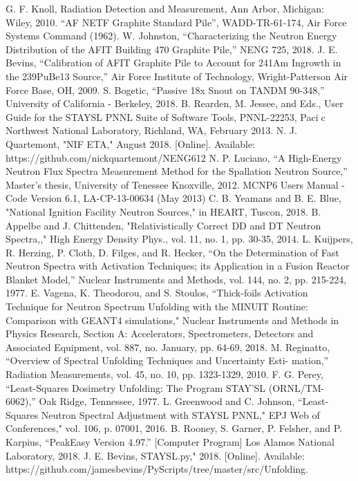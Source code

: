 \documentclass[journal]{IEEEtran}
\begin{document}
	\begin{thebibliography}{17}
		G. F. Knoll, Radiation Detection and Measurement, Ann Arbor,
		Michigan: Wiley, 2010.
		“AF NETF Graphite Standard Pile”, WADD-TR-61-174, Air Force Systems Command (1962).
		W. Johnston, “Characterizing the Neutron Energy Distribution of the AFIT Building 470 Graphite Pile,” NENG 725, 2018.
		J. E. Bevins, “Calibration of AFIT Graphite Pile to Account for 241Am Ingrowth in the 239PuBe13 Source,” Air Force Institute of Technology, Wright-Patterson Air Force Base, OH, 2009. 
		S. Bogetic, “Passive 18x Snout on TANDM 90-348,” University of California - Berkeley, 2018.  
		B. Rearden, M. Jessee, and Eds., User Guide for the STAYSL PNNL Suite of
		Software Tools, PNNL-22253, Pacic Northwest National Laboratory, Richland,
		WA, February 2013.
		N. J. Quartemont, "NIF ETA," August 2018. [Online]. Available:
		https://github.com/nickquartemont/NENG612
		N. P. Luciano, “A High-Energy Neutron Flux Spectra Measurement Method for
		the Spallation Neutron Source,” Master's thesis, University of Tenessee Knoxville,
		2012.
		MCNP6 Users Manual - Code Version 6.1, LA-CP-13-00634 (May 2013)
		C. B. Yeamans and B. E. Blue, "National Ignition Facility Neutron 
		Sources," in HEART, Tuscon, 2018. 
		B. Appelbe and J. Chittenden, "Relativistically Correct DD and DT 
		Neutron Spectra,," High Energy Density Phys., vol. 11, no. 1, pp. 
		30-35, 2014.
		L. Kuijpers, R. Herzing, P. Cloth, D. Filges, and R. Hecker, “On the Determination of Fast Neutron Spectra with Activation 
		Techniques; its Application in a Fusion Reactor Blanket Model,” Nuclear Instruments and Methods, vol. 144, no. 2, pp. 215-224, 1977. 
		E. Vagena, K. Theodorou, and S. Stoulos, “Thick-foils Activation Technique
		for Neutron Spectrum Unfolding with the MINUIT Routine: Comparison
		with GEANT4 simulations," Nuclear Instruments and Methods in Physics
		Research, Section A: Accelerators, Spectrometers, Detectors and Associated
		Equipment, vol. 887, no. January, pp. 64-69, 2018.
		M. Reginatto, “Overview of Spectral Unfolding Techniques and Uncertainty Esti-
		mation,” Radiation Measurements, vol. 45, no. 10, pp. 1323-1329, 2010.
		F. G. Perey, “Least-Squares Dosimetry Unfolding: The Program STAY'SL
		(ORNL/TM-6062),” Oak Ridge, Tennessee, 1977.
		L. Greenwood and C. Johnson, “Least-Squares Neutron Spectral Adjustment with
		STAYSL PNNL," EPJ Web of Conferences," vol. 106, p. 07001, 2016.
		B. Rooney, S. Garner, P. Felsher, and P. Karpius, “PeakEasy Version 4.97.” [Computer Program] Los Alamos National Laboratory, 2018.
		J. E. Bevins, STAYSL.py," 2018. [Online]. Available: https://github.com/jamesbevins/PyScripts/tree/master/src/Unfolding.
	\end{thebibliography}
	
\end{document}

